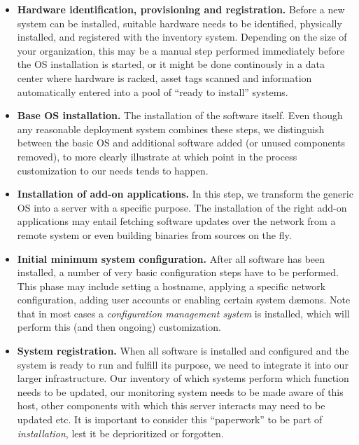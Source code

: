 \begin{itemize}
	\item {\bf Hardware identification, provisioning and registration.}
		Before a new system can be installed, suitable hardware
		needs to be identified, physically installed, and
		registered with the inventory system.  Depending on the
		size of your organization, this may be a manual step
		performed immediately before the OS installation is
		started, or it might be done continously in a data center
		where hardware is racked, asset tags scanned and
		information automatically entered into a pool of
		``ready to install'' systems.

	\item {\bf Base OS installation.}
		The installation of the software itself.  Even though
		any reasonable deployment system combines these steps,
		we distinguish between the basic OS and additional
		software added (or unused components removed), to more
		clearly illustrate at which point in the process
		customization to our needs tends to happen.

	\item {\bf Installation of add-on applications.}
		In this step, we transform the generic OS into a server
		with a specific purpose.  The installation of the right
		add-on applications may entail fetching software updates
		over the network from a remote system or even building
		binaries from sources on the fly.

	\item {\bf Initial minimum system configuration.}
		After all software has been installed, a number of very
		basic configuration steps have to be performed.  This
		phase may include setting a hostname, applying a specific
		network configuration, adding user accounts or enabling
		certain system d\ae mons.  Note that in most cases a {\em
		configuration management system} is installed, which
		will perform this (and then ongoing) customization.

	\item {\bf System registration.}
		When all software is installed and configured and the system
		is ready to run and fulfill its purpose, we need to integrate
		it into our larger infrastructure.  Our inventory of which
		systems perform which function needs to be updated, our
		monitoring system needs to be made aware of this host, other
		components with which this server interacts may need to be
		updated etc.  It is important to consider this
		``paperwork'' to be part of {\em installation}, lest it be
		deprioritized or forgotten.


\end{itemize}
